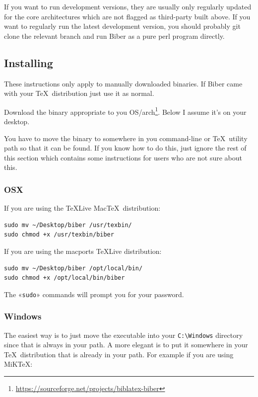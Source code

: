 \documentclass{ltxdockit}
\begin{document}
\noindent If you want to run development versions, they are usually only
regularly updated for the core architectures which are not flagged as
third-party built above. If you want to regularly run the latest
development version, you should probably git clone the relevant branch and
run Biber as a pure perl program directly.

\subsection{Installing}

These instructions only apply to manually downloaded binaries. If
Biber came with your \TeX\ distribution just use it as normal.

Download the binary appropriate to you
OS/arch\footnote{\url{https://sourceforge.net/projects/biblatex-biber}}. Below
I assume it's on your desktop.

You have to move the binary to somewhere in you command-line or \TeX\ utility
path so that it can be found. If you know how to do this, just ignore the
rest of this section which contains some instructions for users who are
not sure about this.

\subsubsection{OSX}

If you are using the \TeX Live Mac\TeX\ distribution:

\begin{verbatim}
sudo mv ~/Desktop/biber /usr/texbin/
sudo chmod +x /usr/texbin/biber
\end{verbatim}

\noindent If you are using the macports \TeX Live distribution:

\begin{verbatim}
sudo mv ~/Desktop/biber /opt/local/bin/
sudo chmod +x /opt/local/bin/biber
\end{verbatim}

\noindent The «\verb+sudo+» commands will prompt you for your password.

\subsubsection{Windows}

The easiest way is to just move the executable into your \verb+C:\Windows+ directory since
that is always in your path. A more elegant is to put it somewhere in
your \TeX\ distribution that is already in your path. For example if you
are using MiK\TeX:
\end{document}

